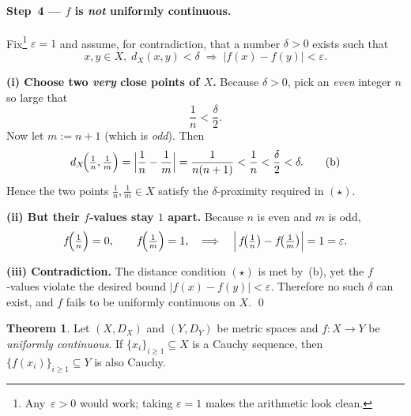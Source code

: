 \documentclass[12pt]{article}
\theoremstyle{definition} %
\newtheorem{theorem}{Theorem}
\theoremstyle{plain} %
\begin{document}
\paragraph{Step 4 — $f$ is \emph{not} uniformly continuous.}

Fix\footnote{Any $\,\varepsilon>0$ would work; taking $\varepsilon=1$ makes
the arithmetic look clean.} $\varepsilon = 1$ and assume, for
contradiction, that a number $\delta>0$ exists such that
\[
   x,y\in X,\;d_X(x,y)<\delta
   \;\Longrightarrow\;
   |f(x)-f(y)|<\varepsilon.
   \tag{$\star$}
\]

\medskip
\noindent\textbf{(i)  Choose two \emph{very} close points of $X$.}
Because $\delta>0$, pick an \emph{even} integer $n$ so large that
\[
   \frac1n < \frac{\delta}{2}.  \tag{a}
\]
Now let $m:=n+1$ (which is \emph{odd}).  Then
\[
   d_X\!\Bigl(\tfrac1n,\tfrac1m\Bigr)
      =\Bigl|\frac1n-\frac1m\Bigr|
      =\frac{1}{n(n+1)}
      <\frac1n
      <\frac{\delta}{2}
      <\delta. \tag{b}
\]
Hence the two points $\tfrac1n,\tfrac1m\in X$ satisfy the
$\delta$‑proximity required in $(\star)$.

\medskip
\noindent\textbf{(ii)  But their $f$‑values stay $1$ apart.}
Because $n$ is even and $m$ is odd,
\[
   f\!\Bigl(\tfrac1n\Bigr)=0,
   \qquad
   f\!\Bigl(\tfrac1m\Bigr)=1,
   \quad\Longrightarrow\quad
   \Bigl|\,f\!\bigl(\tfrac1n\bigr)-f\!\bigl(\tfrac1m\bigr)\Bigr|=1=\varepsilon.
\]

\medskip
\noindent\textbf{(iii)  Contradiction.}  
The distance condition \((\star)\) is met by~(b), yet the
$f$‑values violate the desired bound $|f(x)-f(y)|<\varepsilon$.  
Therefore no such $\delta$ can exist, and $f$ fails to be uniformly
continuous on $X$.
\qed
\begin{theorem}\label{thm:uniform_cauchy}
  Let $(X,D_X)$ and $(Y,D_Y)$ be metric spaces and
  $f:X\to Y$ be \emph{uniformly continuous}.
  If $\{x_i\}_{i\ge 1}\subseteq X$ is a Cauchy sequence,  
  then $\{f(x_i)\}_{i\ge 1}\subseteq Y$ is also Cauchy.
\end{theorem}
\end{document}
